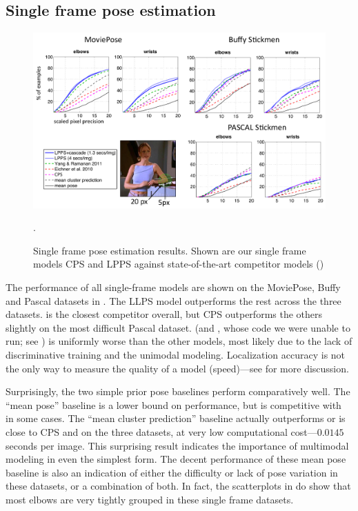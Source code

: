 \subsection{Single frame pose estimation}
\begin{figure}[tb]
\begin{center}
\includegraphics[width=1.00\textwidth]{figs/results-mpose-buffy-pascal.pdf}
\caption[Single frame pose estimation results.]{Single frame pose estimation 
results.  Shown are our single frame models CPS and LPPS against 
state-of-the-art competitor models ()}.
\label{fig:results-mpose-buffy-pascal}
\end{center}
\end{figure}
The performance of all single-frame models are shown on the MoviePose, Buffy 
and Pascal datasets in .  The LLPS model 
outperforms the rest across the three datasets.  \citet{deva2011} is the 
closest competitor overall, but CPS outperforms the others slightly on the most 
difficult Pascal dataset. \citet{eichner-tr} (and \citet{andriluka09}, whose 
code we were unable to run; see ) is uniformly worse than the 
other models, most likely due to the lack of discriminative training and the 
unimodal modeling.   Localization accuracy is not the only way to measure the 
quality of a model (\eg speed)---see  for more discussion.

Surprisingly, the two simple prior pose baselines perform comparatively well.  
The ``mean pose'' baseline is a lower bound on performance, but is competitive 
with~\cite{eichner-tr} in some cases. The ``mean cluster prediction'' baseline 
actually outperforms or is close to CPS and \citet{eichner-tr} on the three 
datasets, at very low computational cost---$0.0145$ seconds per image.  This 
surprising result indicates the importance of multimodal modeling in even the 
simplest form.  The decent performance of these mean pose baseline is also an 
indication of either the difficulty or lack of pose variation in these 
datasets, or a combination of both.  In fact, the scatterplots in 
 do show that most elbows are very tightly grouped 
in these single frame datasets. 

